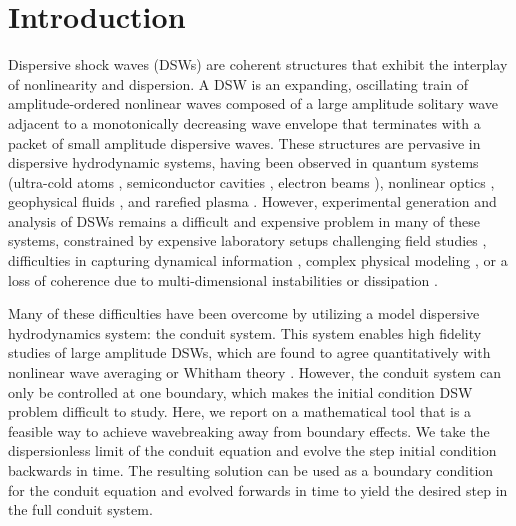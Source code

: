 \documentclass{jfm}
\begin{document}
\section{Introduction}\label{sec:Intro}
Dispersive shock waves (DSWs) are coherent structures that exhibit the interplay of nonlinearity and dispersion. A DSW is an expanding, oscillating train of amplitude-ordered nonlinear waves composed of a large amplitude solitary wave adjacent to a monotonically decreasing wave envelope that terminates with a packet of small amplitude dispersive waves. These structures are pervasive in dispersive hydrodynamic systems, having been observed in 
quantum systems (ultra-cold atoms \cite{dutton_observation_2001,hoefer_dispersive_2006}, semiconductor cavities \cite{amo_polariton_2011}, 
electron beams \cite{mo_experimental_2013}), 
nonlinear optics \cite{rothenberg_observation_1989},
geophysical fluids \cite{hammack_korteweg-vries_1978,farmer_generation_1999}, and
rarefied plasma \cite{taylor_observation_1970}. %
However, experimental generation and analysis of DSWs remains a difficult and expensive problem in many of these systems, constrained by expensive laboratory setups
\cite{dutton_observation_2001,hoefer_dispersive_2006,mo_experimental_2013,hammack_korteweg-vries_1978}
challenging field studies \cite{farmer_generation_1999},
difficulties in capturing dynamical information \cite{rothenberg_observation_1991,dutton_observation_2001,hoefer_dispersive_2006},
complex physical modeling \cite{farmer_generation_1999}, or a loss of
coherence due to multi-dimensional instabilities \cite{dutton_observation_2001,amo_polariton_2011} or dissipation \cite{taylor_observation_1970,mo_experimental_2013}.  

Many of these difficulties have been overcome by utilizing a model dispersive hydrodynamics system: the conduit system. 
This system enables high fidelity studies of large amplitude DSWs,
which are found to agree quantitatively with nonlinear wave averaging
or Whitham theory
\cite{whitham_linear_1974,gurevich_nonstationary_1974,lowman_dispersive_2013,maiden_observation_2016}. 
However, the conduit system can only be controlled at one boundary, which makes the initial condition DSW problem difficult to study.
Here, we report on a mathematical tool that is a feasible way to achieve wavebreaking away from boundary effects. 
We take the dispersionless limit of the conduit equation and evolve the step initial condition backwards in time.
The resulting solution can be used as a boundary condition for the conduit equation and evolved forwards in time to yield the desired step in the full conduit system.
\end{document}
